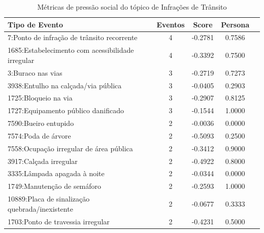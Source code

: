 \begin{table}[htbp]
	\centering
	\caption{Métricas de pressão social do tópico de Infrações de Trânsito}
	\label{tab:eventos_populares_traffic}
	\begin{tabular}{|l|c|c|c|c|}
		\hline
		\textbf{Tipo de Evento}                           & \textbf{Eventos} & \textbf{Score} & \textbf{Persona} \\
		\hline
		7:Ponto de infração de trânsito recorrente        & 4                & -0.2781        & 0.7586           \\
		\hline
		1685:Estabelecimento com acessibilidade irregular & 4                & -0.3392        & 0.7500           \\
		\hline
		3:Buraco nas vias                                 & 3                & -0.2719        & 0.7273           \\
		\hline
		3938:Entulho na calçada/via pública               & 3                & -0.0405        & 0.2903           \\
		\hline
		1725:Bloqueio na via                              & 3                & -0.2907        & 0.8125           \\
		\hline
		1727:Equipamento público danificado               & 3                & -0.1544        & 1.0000           \\
		\hline
		7590:Bueiro entupido                              & 2                & -0.0036        & 0.0000           \\
		\hline
		7574:Poda de árvore                               & 2                & -0.5093        & 0.2500           \\
		\hline
		7558:Ocupação irregular de área pública           & 2                & -0.3412        & 0.9000           \\
		\hline
		3917:Calçada irregular                            & 2                & -0.4922        & 0.8000           \\
		\hline
		3335:Lâmpada apagada à noite                      & 2                & -0.0344        & 0.0000           \\
		\hline
		1749:Manutenção de semáforo                       & 2                & -0.2593        & 1.0000           \\
		\hline
		10889:Placa de sinalização quebrada/inexistente   & 2                & -0.0677        & 0.3333           \\
		\hline
		1703:Ponto de travessia irregular                 & 2                & -0.4231        & 0.5000           \\

\end{tabular}
\end{table}
